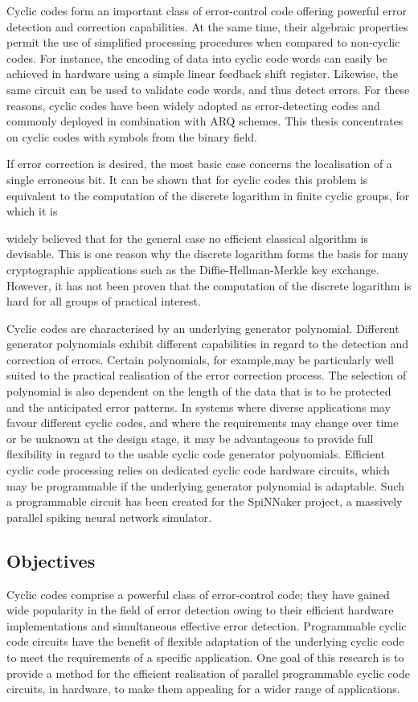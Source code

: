 \documentclass[a4paper, 11pt]{article}
\begin{document}
Cyclic codes form an important class of error-control code offering powerful error detection and correction capabilities. At the same time, their algebraic properties permit the use of simplified processing procedures when compared to non-cyclic codes. For instance, the encoding of data into cyclic code words can easily be achieved in hardware using a simple linear feedback shift register. Likewise, the same circuit can be used to validate code words, and thus detect errors. For these reasons, cyclic codes have been widely adopted as error-detecting codes and commonly deployed in combination with ARQ schemes. This thesis concentrates on cyclic codes with symbols from the binary field.

If error correction is desired, the most basic case concerns the localisation of a single erroneous bit. It can be shown that for cyclic codes this problem is equivalent to the computation of the discrete logarithm in finite cyclic groups, for which it is

widely believed that for the general case no efficient classical algorithm is devisable. This is one reason why the discrete logarithm forms the basis for many cryptographic applications such as the Diffie-Hellman-Merkle key exchange. However, it has not been proven that the computation of the discrete logarithm is hard for all groups of practical interest.

Cyclic codes are characterised by an underlying generator polynomial. Different generator polynomials exhibit different capabilities in regard to the detection and correction of errors. Certain polynomials, for example,may be particularly well suited to the practical realisation of the error correction process. The selection of polynomial is also dependent on the length of the data that is to be protected and the anticipated error patterns. In systems where diverse applications may favour different cyclic codes, and where the requirements may change over time or be unknown at the design stage, it may be advantageous to provide full flexibility in regard to the usable cyclic code generator polynomials. Efficient cyclic code processing relies on dedicated cyclic code hardware circuits, which may be programmable if the underlying generator polynomial is adaptable. Such a programmable circuit has been created for the SpiNNaker project, a massively parallel spiking neural network simulator.

\subsection{Objectives}
Cyclic codes comprise a powerful class of error-control code; they have gained wide popularity in the field of error detection owing to their efficient hardware implementations and simultaneous effective error detection. Programmable cyclic code circuits have the benefit of flexible adaptation of the underlying cyclic code to meet the requirements of a specific application. One goal of this research is to provide a method for the efficient realisation of parallel programmable cyclic code circuits, in hardware, to make them appealing for a wider range of applications.
\end{document}

